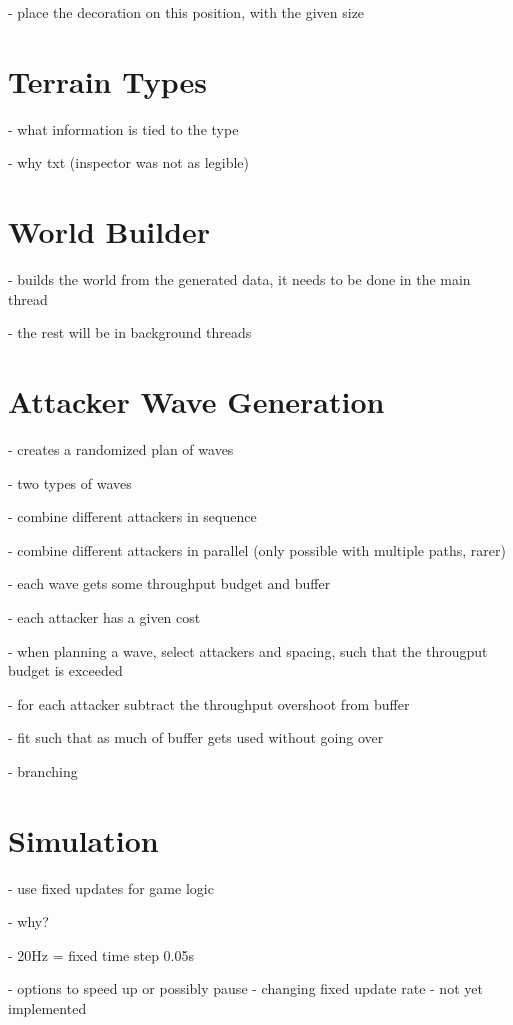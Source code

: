 - place the decoration on this position, with the given size

\section{Terrain Types}

- what information is tied to the type

- why txt (inspector was not as legible)

\section{World Builder}

- builds the world from the generated data, it needs to be done in the main thread

- the rest will be in background threads

\section{Attacker Wave Generation}

- creates a randomized plan of waves

- two types of waves

- combine different attackers in sequence

- combine different attackers in parallel (only possible with multiple paths, rarer)

- each wave gets some throughput budget and buffer

- each attacker has a given cost

- when planning a wave, select attackers and spacing, such that the througput budget is exceeded

- for each attacker subtract the throughput overshoot from buffer

- fit such that as much of buffer gets used without going over

- branching

\section{Simulation}

- use fixed updates for game logic

- why?

- 20Hz = fixed time step 0.05s

- options to speed up or possibly pause - changing fixed update rate - not yet implemented

